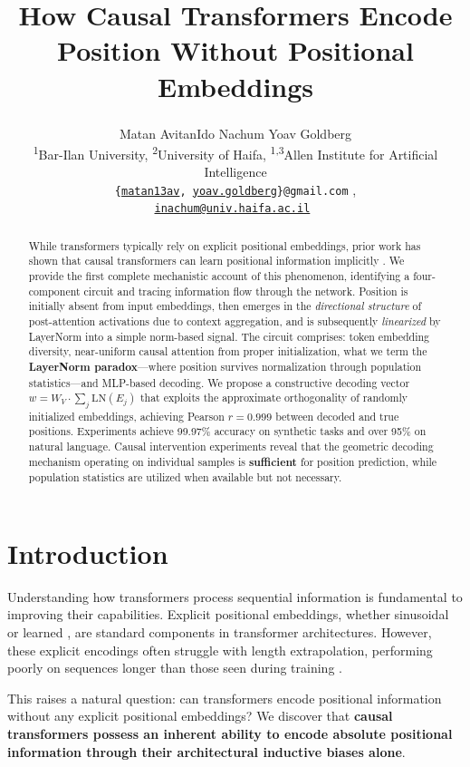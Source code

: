 \documentclass[11pt]{article}
\title{How Causal Transformers Encode Position Without Positional Embeddings}
\author{Matan Avitan\textsuperscript{\normalfont1}\quad Ido Nachum\textsuperscript{\normalfont2} \quad Yoav Goldberg\textsuperscript{\normalfont1} \\
\textsuperscript{1}Bar-Ilan University, \textsuperscript{2}University of Haifa, \textsuperscript{1,3}Allen Institute for Artificial Intelligence \\ 
  { \tt\{\href{mailto:matan13av@gmail.com}{matan13av}, \href{mailto:yoav.goldberg@gmail.com}{yoav.goldberg}\}@gmail.com} , \\\tt{\href{mailto:inachum@univ.haifa.ac.il}{inachum@univ.haifa.ac.il}}
   }
\begin{document}
\maketitle
\begin{abstract}
While transformers typically rely on explicit positional embeddings, prior work has shown that causal transformers can learn positional information implicitly \citep{haviv2022transformer, chi-etal-2023-latent}. We provide the first complete mechanistic account of this phenomenon, identifying a four-component circuit and tracing information flow through the network. Position is initially absent from input embeddings, then emerges in the \textit{directional structure} of post-attention activations due to context aggregation, and is subsequently \textit{linearized} by LayerNorm into a simple norm-based signal. The circuit comprises: token embedding diversity, near-uniform causal attention from proper initialization, what we term the \textbf{LayerNorm paradox}---where position survives normalization through population statistics---and MLP-based decoding. We propose a constructive decoding vector $w = W_V \cdot \sum_j \text{LN}(E_j)$ that exploits the approximate orthogonality of randomly initialized embeddings, achieving Pearson $r = 0.999$ between decoded and true positions. Experiments achieve 99.97\% accuracy on synthetic tasks and over 95\% on natural language. Causal intervention experiments reveal that the geometric decoding mechanism operating on individual samples is \textbf{sufficient} for position prediction, while population statistics are utilized when available but not necessary.
\end{abstract}

\section{Introduction}\label{sec:introduction}
Understanding how transformers process sequential information is fundamental to improving their capabilities. Explicit positional embeddings, whether sinusoidal \citep{vaswani2017attention} or learned \citep{bert}, are standard components in transformer architectures. However, these explicit encodings often struggle with length extrapolation, performing poorly on sequences longer than those seen during training \citep{alibi}.

This raises a natural question: can transformers encode positional information without any explicit positional embeddings? We discover that \textbf{causal transformers possess an inherent ability to encode absolute positional information through their architectural inductive biases alone}.
\end{document}
